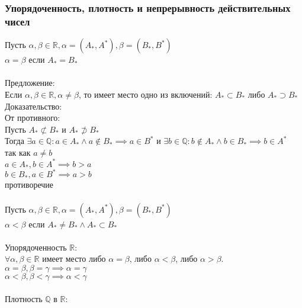 \documentclass{article}
\begin{document}
        \subsubsection*{Упорядоченность, плотность и непрерывность действительных чисел}
        Пусть $\alpha, \beta \in \mathbb{R}, \alpha = (A_*, A^*), \beta = (B_*, B^*)$
        \\
        $\alpha = \beta$ если $A_* = B_*$
        \\     
        \\
        Предложение:
        \\
        Если $\alpha, \beta \in \mathbb{R}, \alpha \neq \beta$, то имеет место одно из включений: $A_* \subset B_*$ либо $A_* \supset B_*$
        \\
        Доказательство:
        \\
        От противного:
        \\
        Пусть $A_* \not\subset B_*$ и $A_* \not\supset B_*$ 
        \\
        Тогда $\exists a \in \mathbb{Q}: a \in A_* \wedge a \notin B_* \implies a \in B^*$
        и $\exists b \in \mathbb{Q}: b \notin A_* \wedge b \in B_* \implies b \in A^*$
        \\
        так как $a \neq b$
        \\
        $a \in A_*, b \in A^* \implies b > a$
        \\
        $b \in B_*, a \in B^* \implies a > b$
        \\
        противоречие
        \\
        \\
        Пусть $\alpha, \beta \in \mathbb{R}, \alpha = (A_*, A^*), \beta = (B_*, B^*)$
        \\
        $\alpha < \beta$ если $A_* \neq B_* \wedge A_* \subset B_*$
        \\
        \\
        Упорядоченность $\mathbb{R}$:
        \\
        $\forall \alpha, \beta \in \mathbb{R}$ имеет место либо $\alpha = \beta$, либо $\alpha < \beta$,  либо $\alpha > \beta$.
        \\
        $ \alpha = \beta, \beta = \gamma \implies \alpha = \gamma$
        \\
        $ \alpha < \beta, \beta < \gamma \implies \alpha < \gamma$
        \\
        \\
        Плотность $\mathbb{Q}$ в $\mathbb{R}$:
        \\
\end{document}
